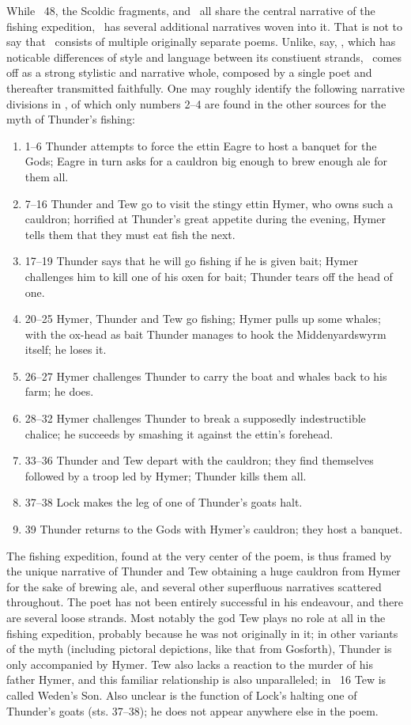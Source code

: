 While \Gylfaginning\ 48, the Scoldic fragments, and \Hymiskvida\ all share the central narrative of the fishing expedition, \Hymiskvida\ has several additional narratives woven into it.  That is not to say that \Hymiskvida\ consists of multiple originally separate poems.  Unlike, say, \Havamal, which has noticable differences of style and language between its constiuent strands, \Hymiskvida\ comes off as a strong stylistic and narrative whole, composed by a single poet and thereafter transmitted faithfully.  One may roughly identify the following narrative divisions in \Hymiskvida, of which only numbers 2–4 are found in the other sources for the myth of Thunder’s fishing:

\begin{enumerate}
  \item 1–6 Thunder attempts to force the ettin Eagre to host a banquet for the Gods; Eagre in turn asks for a cauldron big enough to brew enough ale for them all.
  \item 7–16 Thunder and Tew go to visit the stingy ettin Hymer, who owns such a cauldron; horrified at Thunder’s great appetite during the evening, Hymer tells them that they must eat fish the next.
  \item 17–19 Thunder says that he will go fishing if he is given bait; Hymer challenges him to kill one of his oxen for bait; Thunder tears off the head of one.
  \item 20–25 Hymer, Thunder and Tew go fishing; Hymer pulls up some whales; with the ox-head as bait Thunder manages to hook the Middenyardswyrm itself; he loses it.
  \item 26–27 Hymer challenges Thunder to carry the boat and whales back to his farm; he does.
  \item 28–32 Hymer challenges Thunder to break a supposedly indestructible chalice; he succeeds by smashing it against the ettin’s forehead.
  \item 33–36 Thunder and Tew depart with the cauldron; they find themselves followed by a troop led by Hymer; Thunder kills them all.
  \item 37–38 Lock makes the leg of one of Thunder’s goats halt.
  \item 39 Thunder returns to the Gods with Hymer’s cauldron; they host a banquet.
\end{enumerate}

The fishing expedition, found at the very center of the poem, is thus framed by the unique narrative of Thunder and Tew obtaining a huge cauldron from Hymer for the sake of brewing ale, and several other superfluous narratives scattered throughout.  The poet has not been entirely successful in his endeavour, and there are several loose strands.  Most notably the god Tew plays no role at all in the fishing expedition, probably because he was not originally in it; in other variants of the myth (including pictoral depictions, like that from Gosforth), Thunder is only accompanied by Hymer.  Tew also lacks a reaction to the murder of his father Hymer, and this familiar relationship is also unparalleled; in \Skaldskaparmal\ 16 Tew is called Weden’s Son.   Also unclear is the function of Lock’s halting one of Thunder’s goats (sts. 37–38); he does not appear anywhere else in the poem.

